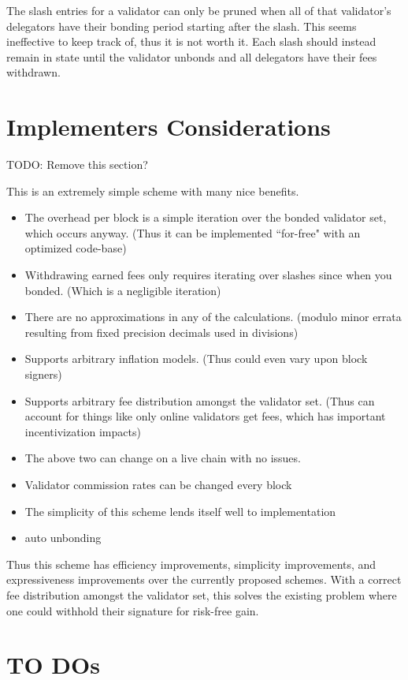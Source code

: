 \documentclass[]{article}
\begin{document}
The slash entries for a validator can only be pruned when all of that validator's delegators have their bonding period starting after the slash.
This seems ineffective to keep track of, thus it is not worth it.
Each slash should instead remain in state until the validator unbonds and all delegators have their fees withdrawn.

\section{Implementers Considerations}
TODO: Remove this section?

This is an extremely simple scheme with many nice benefits. 
\begin{itemize}
	\item The overhead per block is a simple iteration over the bonded validator set, which occurs anyway. (Thus it can be implemented ``for-free" with an optimized code-base)
	\item Withdrawing earned fees only requires iterating over slashes since when you bonded. (Which is a negligible iteration)
	\item There are no approximations in any of the calculations. (modulo minor errata resulting from fixed precision decimals used in divisions)
	\item Supports arbitrary inflation models. (Thus could even vary upon block signers)
	\item Supports arbitrary fee distribution amongst the validator set. (Thus can account for things like only online validators get fees, which has important incentivization impacts)
	\item The above two can change on a live chain with no issues.
	\item Validator commission rates can be changed every block
	\item The simplicity of this scheme lends itself well to implementation
	\item auto unbonding 
\end{itemize}

Thus this scheme has efficiency improvements, simplicity improvements, and expressiveness improvements over the currently proposed schemes. With a correct fee distribution amongst the validator set, this solves the existing problem where one could withhold their signature for risk-free gain.

\section{TO DOs}
\end{document}
